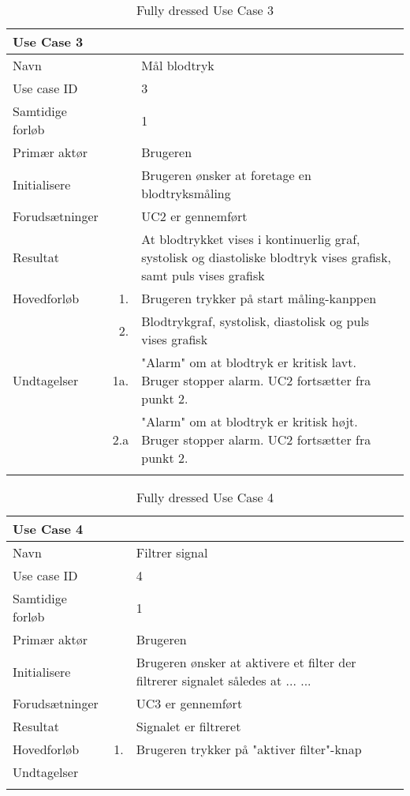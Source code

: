 \begin{longtabu} to  %
    {\large \textbf{Use Case 3}} && \\
    \toprule
    Navn &&    Mål blodtryk\\
    Use case ID &&    3\\
    Samtidige forløb &&    1\\
    Primær aktør &&    Brugeren\\
    Initialisere &&    Brugeren ønsker at foretage en blodtryksmåling\\
    Forudsætninger && UC2 er gennemført\\
    Resultat &&    At blodtrykket vises i kontinuerlig graf, systolisk og diastoliske blodtryk vises grafisk, samt puls vises grafisk                     \\ \midrule
    Hovedforløb &    1. &    Brugeren trykker på start måling\--kanppen\\
    			& 	 2. & Blodtrykgraf, systolisk, diastolisk og puls vises grafisk  \\ \midrule               
    Undtagelser &    1a. & "Alarm" om at blodtryk er kritisk lavt. Bruger stopper alarm. UC2 fortsætter fra punkt 2. \\  & 2.a & "Alarm" om at blodtryk er kritisk højt. Bruger stopper alarm. UC2 fortsætter fra punkt 2. \\ \bottomrule
\caption{Fully dressed Use Case 3}
\label{UC3}
\end{longtabu}

\begin{longtabu} to  %
    {\large \textbf{Use Case 4}} && \\
    \toprule
    Navn &&    Filtrer signal\\
    Use case ID &&    4\\
    Samtidige forløb &&    1\\
    Primær aktør &&    Brugeren\\
    Initialisere &&    Brugeren ønsker at aktivere et filter der filtrerer signalet således at ... ... \\
    Forudsætninger && UC3 er gennemført\\
    Resultat &&    Signalet er filtreret                   \\ \midrule
    Hovedforløb &    1. &    Brugeren trykker på "aktiver filter"\--knap  \\  		
    Undtagelser &     \\ \bottomrule
\caption{Fully dressed Use Case 4}
\label{UC4}
\end{longtabu}


